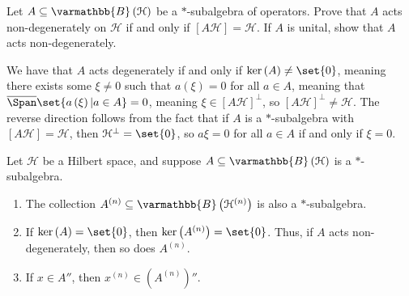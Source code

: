 \documentclass[10pt]{mypackage}
\renewcommand*{\mathbb}[1]{\varmathbb{#1}}
\newcommand{\B}{\mathbb{B}}
\begin{document}
\begin{exercise}
  Let $A\subseteq \B\left(\mathcal{H}\right)$ be a $\ast$-subalgebra of operators. Prove that $A$ acts non-degenerately on $\mathcal{H}$ if and only if $\left[A \mathcal{H}\right] = \mathcal{H}$. If $A$ is unital, show that $A$ acts non-degenerately.
\end{exercise}
\begin{solution}
  We have that $A$ acts degenerately if and only if $\ker\left(A\right)\neq \set{0}$, meaning there exists some $\xi\neq 0$ such that $a\left(\xi\right) = 0$ for all $a\in A$, meaning that $\overline{\Span}\set{a\left(\xi\right) | a\in A} = 0$, meaning $\xi\in \left[A\mathcal{H}\right]^{\perp}$, so $\left[A\mathcal{H}\right]^{\perp}\neq \mathcal{H}$. The reverse direction follows from the fact that if $A$ is a $\ast$-subalgebra with $\left[A\mathcal{H}\right] = \mathcal{H}$, then $\mathcal{H}^{\perp} = \set{0}$, so $a\xi = 0$ for all $a\in A$ if and only if $\xi = 0$.
\end{solution}
\begin{lemma}
  Let $\mathcal{H}$ be a Hilbert space, and suppose $A\subseteq \B\left(\mathcal{H}\right)$ is a $\ast$-subalgebra.
  \begin{enumerate}[(1)]
    \item The collection $A^{(n)}\subseteq \B\left(\mathcal{H}^{(n)}\right)$ is also a $\ast$-subalgebra.
    \item If $\ker\left(A\right) = \set{0}$, then $\ker\left(A^{(n)}\right) = \set{0}$. Thus, if $A$ acts non-degenerately, then so does $A^{(n)}$.
    \item If $x\in A''$, then $x^{(n)}\in \left(A^{(n)}\right)''$.
  \end{enumerate}
\end{lemma}
\end{document}
